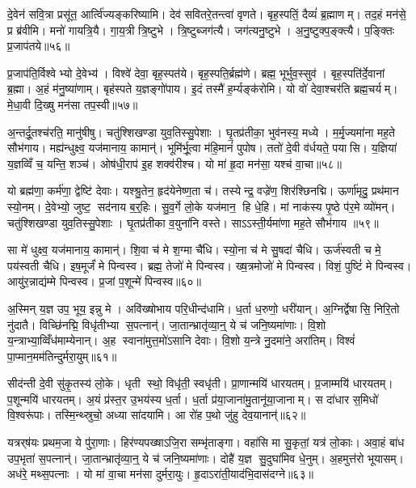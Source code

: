 दे॒वेन॑ सवि॒त्रा प्रसू॑त॒ आर्त्वि॑ज्यङ्करिष्यामि। देव॑ सवितरे॒तन्त्वा॑ वृणते। बृह॒स्पतिं॒ दैव्यं॑ ब्र॒ह्माणम्। तद॒हं मन॑से॒ प्र ब्र॑वीमि। मनो॑ गायत्रि॒यै। गा॒य॒त्री त्रि॒ष्टुभे। त्रि॒ष्टुब्जग॑त्यै। जग॑त्यनु॒ष्टुभे। अ॒नु॒ष्टुक्प॒ङ्क्त्यै। प॒ङ्क्तिः प्र॒जाप॑तये॥५६॥

प्र॒जाप॑ति॒र्विश्वेभ्यो दे॒वेभ्य॑। विश्वे॑ देवा॒ बृह॒स्पत॑ये। बृह॒स्पति॒र्ब्रह्म॑णे। ब्रह्म॒ भूर्भुव॒स्सुव॑। बृह॒स्पति॑र्दे॒वानां ब्र॒ह्मा। अ॒हं म॑नु॒ष्या॑णाम्। बृह॑स्पते य॒ज्ञङ्गो॑पाय। इ॒दं तस्मै॑ ह॒र्म्यङ्क॑रोमि। यो वो॑ देवा॒श्चर॑ति ब्रह्म॒चर्यम्। मे॒धा॒वी दि॒ख्षु मन॑सा तप॒स्वी॥५७॥

अ॒न्तर्दू॒तश्च॑रति॒ मानु॑षीषु। चतु॑श्शिखण्डा युव॒तिस्सु॒पेशाः। घृ॒तप्र॑तीका॒ भुव॑नस्य॒ मध्ये। म॒र्मृ॒ज्यमा॑ना मह॒ते सौभ॑गाय। मह्य॑न्धुक्ष्व॒ यज॑मानाय॒ कामान्॑। भूमि॑र्भू॒त्वा म॑हि॒मानं॑ पुपोष। ततो॑ दे॒वी व॑र्धयते॒ पयासि। य॒ज्ञिया॑ य॒ज्ञव्विँ च॒ यन्ति॒ शञ्च॑। ओष॑धी॒राप॑ इ॒ह शक्व॑रीश्च। यो मा॑ हृ॒दा मन॑सा॒ यश्च॑ वा॒चा॥५८॥

यो ब्रह्म॑णा॒ कर्म॑णा॒ द्वेष्टि॑ देवाः। यश्श्रु॒तेन॒ हृद॑येनेष्ण॒ता च॑। तस्येन्द्र॒ वज्रे॑ण॒ शिर॑श्छिनद्मि। ऊर्णा॑मृदु॒ प्रथ॑मान स्यो॒नम्। दे॒वेभ्यो॒ जुष्ट॒ सद॑नाय ब॒र्॒हिः। सु॒व॒र्गे लो॒के यज॑मान॒ हि धे॒हि। मां नाक॑स्य पृ॒ष्ठे प॑र॒मे व्यो॑मन्। चतु॑श्शिखण्डा युव॒तिस्सु॒पेशाः। घृ॒तप्र॑तीका व॒युना॑नि वस्ते। साऽऽस्ती॒र्यमा॑णा मह॒ते सौभ॑गाय ॥५९॥

सा मे॑ धुक्ष्व॒ यज॑मानाय॒ कामान्॑। शि॒वा च॑ मे श॒ग्मा चै॑धि। स्यो॒ना च॑ मे सु॒षदा॑ चैधि। ऊर्ज॑स्वती च मे॒ पय॑स्वती चैधि। इष॒मूर्जं॑ मे पिन्वस्व। ब्रह्म॒ तेजो॑ मे पिन्वस्व। ख्ष॒त्रमोजो॑ मे पिन्वस्व। विशं॒ पुष्टिं॑ मे पिन्वस्व। आयु॑र॒न्नाद्य॑म्मे पिन्वस्व। प्र॒जां प॒शून्मे॑ पिन्वस्व॥६०॥

अ॒स्मिन् य॒ज्ञ उप॒ भूय॒ इन्नु मे। अवि॑ख्षोभाय परि॒धीन्द॑धामि। ध॒र्ता ध॒रुणो॒ धरी॑यान्। अ॒ग्निर्द्वेषासि॒ निरि॒तो नु॑दातै। विच्छि॑नद्मि॒ विधृ॑तीभ्या स॒पत्नान्॑। जा॒तान्भ्रातृ॑व्या॒न्॒ ये च॑ जनि॒ष्यमा॑णाः। वि॒शो य॒न्त्राभ्या॒व्विँध॑माम्येनान्। अ॒ह स्वाना॑मुत्त॒मो॑ऽसानि देवाः। वि॒शो य॒न्त्रे नु॒दमा॑ने॒ अरा॑तिम्। विश्वं॑ पा॒प्मान॒मम॑तिन्दुर्मरा॒युम्॥६१॥

सीद॑न्ती दे॒वी सु॑कृ॒तस्य॑ लो॒के। धृती स्थो॒ विधृ॑ती॒ स्वधृ॑ती। प्रा॒णान्मयि॑ धारयतम्। प्र॒जाम्मयि॑ धारयतम्। प॒शून्मयि॑ धारयतम्। अ॒यं प्र॑स्त॒र उ॒भय॑स्य ध॒र्ता। ध॒र्ता प्र॑या॒जाना॑मु॒तानू॑या॒जानाम्। स दा॑धार स॒मिधो॑ वि॒श्वरू॑पाः। तस्मि॒न्थ्स्रुचो॒ अध्या सा॑दयामि। आ रो॑ह प॒थो जु॑हु देव॒यानान्॑॥६२॥

यत्रर्‌ष॑यः प्रथम॒जा ये पु॑रा॒णाः। हिर॑ण्यपख्षाऽजि॒रा सम्भृ॑ताङ्गा। वहा॑सि मा सु॒कृतां॒ यत्र॑ लो॒काः। अवा॒हं बा॑ध उप॒भृता॑ स॒पत्नान्॑। जा॒तान्भ्रातृ॑व्या॒न्॒ ये च॑ जनि॒ष्यमा॑णाः। दोहै॑ य॒ज्ञ सु॒दुघा॑मिव धे॒नुम्। अ॒हमुत्त॑रो भूयासम्। अध॑रे॒ मथ्स॒पत्नाः। यो मा॑ वा॒चा मन॑सा दुर्मरा॒युः। हृ॒दाऽरा॑ती॒याद॑भि॒दास॑दग्ने॥६३॥

